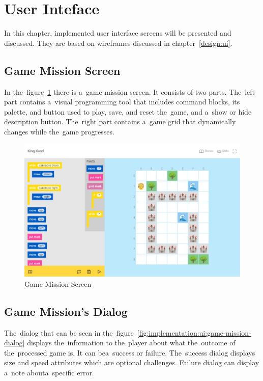 \section{User Inteface}

In this chapter, implemented user interface screens will be presented and discussed.
They are based on wireframes discussed in chapter~\ref{design:ui}.

\subsection{Game Mission Screen}

In the~figure~\ref{fig:implementation:ui:game-mission} there is a~game mission screen.
It consists of two parts.
The~left part contains a~visual programming tool that includes command blocks, its palette, and button used to play, save, and reset the~game, and a~show or hide description button.
The~right part contains a~game grid that dynamically changes while the~game progresses.

\begin{figure}
    \centering
    \includegraphics[width=1\linewidth]{assets/implementation/ui/kingkarel_game_mission.jpeg}
    \caption{Game Mission Screen}
    \label{fig:implementation:ui:game-mission}
\end{figure}

\subsection{Game Mission's Dialog}

The~dialog that can be seen in the~figure~\ref{fig:implementation:ui:game-mission-dialog} displays the~information to the~player about what the~outcome of the~processed game is.
It can be\linebreak{}a~success or failure.
The~success dialog displays size and speed attributes which are optional challenges.
Failure dialog can display a~note about\linebreak{}a~specific error.


